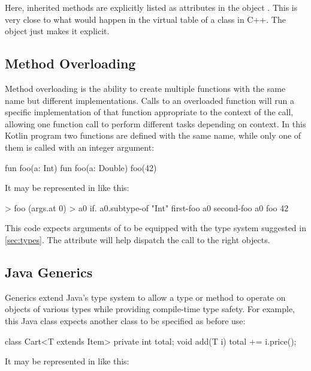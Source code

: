 \documentclass[sigplan,nonacm]{acmart}
\begin{document}
Here, inherited methods are explicitly listed as attributes in the object . This is very close to what would happen in the virtual table of a class  in C++. The \eolang{} object  just makes it explicit.

\subsection{Method Overloading}
\label{sec:overloading}

Method overloading is the ability to create multiple functions with the same name but different implementations. Calls to an overloaded function will run a specific implementation of that function appropriate to the context of the call, allowing one function call to perform different tasks depending on context. In this Kotlin program two functions are defined with the same name, while only one of them is called with an integer argument:

\begin{ffcode}
fun foo(a: Int) {}
fun foo(a: Double) {}
foo(42)
\end{ffcode}

It may be represented in \eolang{} like this:

\begin{ffcode}
[args...] > foo
  (args.at 0) > a0
  if.
    a0.subtype-of "Int"
    first-foo a0
    second-foo a0
foo 42
\end{ffcode}

This code expects arguments of  to be equipped with the type system suggested in \cref{sec:types}. The attribute  will help dispatch the call to the right objects.

\subsection{Java Generics}
\label{sec:generics}

Generics extend Java's type system to allow a type or method to operate on objects of various types while providing compile-time type safety. For example, this Java class expects another class to be specified as  before use:

\begin{ffcode}
class Cart<T extends Item> {
  private int total;
  void add(T i) {
    total += i.price();
  }
}
\end{ffcode}

It may be represented in \eolang{} like this:
\end{document}
